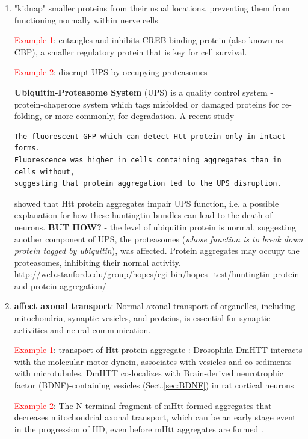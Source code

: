 \begin{enumerate}
  \item  "kidnap" smaller proteins from their usual locations, preventing them
  from functioning normally within nerve cells
  
  \textcolor{red}{Example 1}: entangles and inhibits CREB-binding protein (also
  known as CBP), a smaller regulatory protein that is key for cell survival.
    
  \textcolor{red}{Example 2}: discrupt UPS by occupying proteasomes

{\bf Ubiquitin-Proteasome System} (UPS) is a quality control system -
 protein-chaperone system which tags misfolded or damaged proteins for
 re-folding, or more commonly, for degradation. A recent study 
{\small 
\begin{verbatim}
The fluorescent GFP which can detect Htt protein only in intact forms.
Fluorescence was higher in cells containing aggregates than in cells without,
suggesting that protein aggregation led to the UPS disruption.
\end{verbatim}
}
showed that Htt protein aggregates  impair UPS function, i.e. a possible
explanation for how these huntingtin bundles can lead to the death of neurons.
{\bf BUT HOW?} - the level of ubiquitin protein is normal, suggesting another
component of UPS, the proteasomes ({\it whose function is to break down protein
tagged by ubiquitin}), was affected. Protein aggregates may occupy the
proteasomes, inhibiting their normal activity.
 \url{http://web.stanford.edu/group/hopes/cgi-bin/hopes_test/huntingtin-protein-and-protein-aggregation/}


  \item {\bf affect axonal transport}: Normal axonal transport of organelles,
  including mitochondria, synaptic vesicles, and proteins, is essential for
  synaptic activities and neural communication.
  
  
  \textcolor{red}{Example 1}: transport of Htt protein aggregate
  \citep{gunawardena2003}:
  Drosophila DmHTT interacts with the molecular motor dynein, associates with
  vesicles and co-sediments with microtubules.
  DmHTT co-localizes with Brain-derived neurotrophic factor (BDNF)-containing
  vesicles (Sect.\ref{sec:BDNF}) in rat cortical neurons \citep{zala2013}
  
  \textcolor{red}{Example 2}:  The N-terminal fragment of mHtt formed aggregates
  that decreases mitochondrial axonal transport, which can be an early stage
  event in the progression of HD, even before mHtt aggregates are formed
  \citep{tian2014}.  
  

\end{enumerate}
